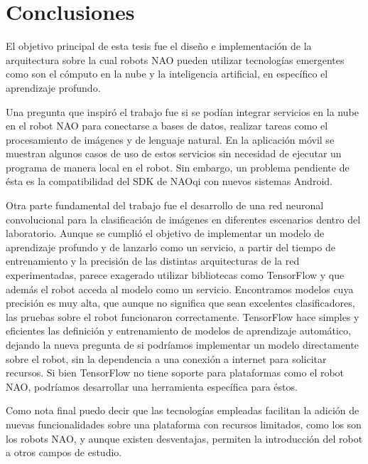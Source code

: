 \chapter*{Conclusiones}
\label{\detokenize{conclusion:cloudnao-una-arquitectura-de-software-para-la-integracion-de-computo-en-la-nube-con-robots-nao}}\label{\detokenize{conclusion:conclusion}}\label{\detokenize{conclusion::doc}}


El objetivo principal de esta tesis fue el diseño e implementación de
la arquitectura sobre la cual robots NAO pueden
utilizar tecnologías emergentes como son el cómputo en la nube y
la inteligencia artificial, en específico el aprendizaje profundo.

Una pregunta que inspiró el trabajo
fue si se podían integrar servicios en la nube
en el robot NAO para conectarse a bases de datos, realizar tareas como el procesamiento de imágenes y de lenguaje natural. En la aplicación
móvil se muestran algunos casos de uso de estos servicios
sin necesidad de ejecutar un programa de manera local
en el robot. Sin embargo, un problema pendiente de ésta
es la compatibilidad del SDK de NAOqi con nuevos sistemas
Android.

Otra parte fundamental del trabajo fue el desarrollo
de una red neuronal convolucional para la clasificación
de imágenes en diferentes escenarios dentro del laboratorio.
Aunque se cumplió el objetivo de implementar un modelo
de aprendizaje profundo y de lanzarlo como un servicio, 
a partir del tiempo de entrenamiento y la precisión de las
distintas arquitecturas de la red experimentadas,
parece exagerado utilizar bibliotecas como TensorFlow 
y que además el robot acceda al modelo como
un servicio.
Encontramos modelos
cuya precisión es muy alta, que aunque no significa que sean excelentes clasificadores,
las pruebas sobre el robot funcionaron correctamente.
TensorFlow hace simples y eficientes
las definición y entrenamiento de modelos de aprendizaje automático,
dejando la nueva pregunta de si podríamos implementar un modelo 
directamente sobre el robot, sin la dependencia a una conexión
a internet para solicitar recursos. Si bien TensorFlow
no tiene soporte para plataformas como el robot NAO, podríamos
desarrollar una herramienta específica para éstos. 

Como nota final puedo decir que las tecnologías empleadas
facilitan la adición
de nuevas funcionalidades sobre una plataforma con recursos
limitados, como los son los robots NAO, y aunque existen desventajas,
permiten la introducción
del robot a otros campos de estudio.
